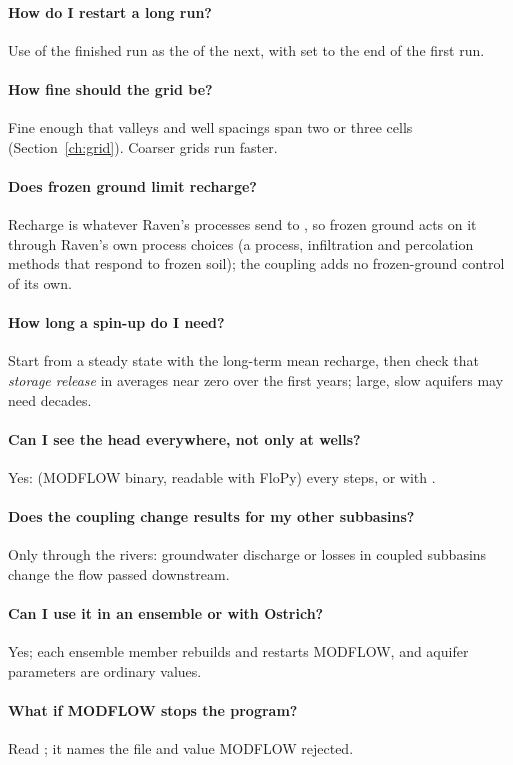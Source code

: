 \paragraph{How do I restart a long run?} Use  of the finished run as the  of the next, with
 set to the end of the first run.
\paragraph{How fine should the grid be?} Fine enough that valleys and well spacings span two or three cells
(Section~\ref{ch:grid}). Coarser grids run faster.
\paragraph{Does frozen ground limit recharge?} Recharge is whatever Raven's processes send to , so frozen
ground acts on it through Raven's own process choices (a  process, infiltration and percolation methods
that respond to frozen soil); the coupling adds no frozen-ground control of its own.
\paragraph{How long a spin-up do I need?} Start from a steady state with the long-term mean recharge, then check that
\emph{storage release} in  averages near zero over the first years; large, slow aquifers may need decades.
\paragraph{Can I see the head everywhere, not only at wells?} Yes:  (MODFLOW binary, readable with FloPy)
every  steps, or  with .
\paragraph{Does the coupling change results for my other subbasins?} Only through the rivers: groundwater discharge or losses
in coupled subbasins change the flow passed downstream.
\paragraph{Can I use it in an ensemble or with Ostrich?} Yes; each ensemble member rebuilds and restarts MODFLOW, and aquifer
parameters are ordinary  values.
\paragraph{What if MODFLOW stops the program?} Read ; it names the file and value MODFLOW rejected.
